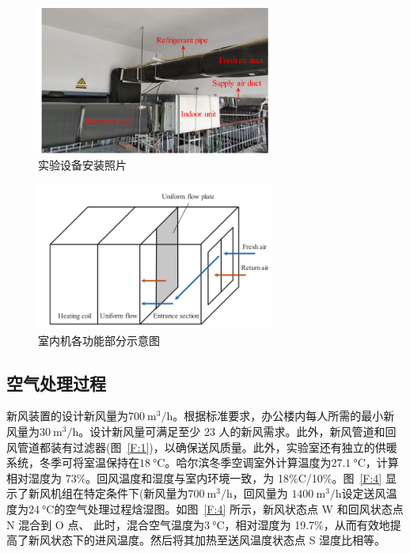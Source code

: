 \begin{figure}[htbp]
	\centering
	\includegraphics[width=0.7\textwidth]{figure/figure_2}
	\caption{实验设备安装照片}
	\label{F:2}
\end{figure}

\begin{figure}[htbp]
	\centering
	\includegraphics[width=0.7\textwidth]{figure/figure_3}
	\caption{室内机各功能部分示意图}
	\label{F:3}
\end{figure}

\subsection{空气处理过程}
新风装置的设计新风量为$\qty{700}{\m^3/\hour}$。根据标准要求，办公楼内每人所需的最小新风量为$\qty{30}{\m^3/\hour} $。设计新风量可满足至少 23 人的新风需求。此外，新风管道和回风管道都装有过滤器(图~\ref{F:1})，以确保送风质量。此外，实验室还有独立的供暖系统，冬季可将室温保持在$\qty{18}{\degreeCelsius} $。哈尔滨冬季空调室外计算温度为$\qty{27.1}{\degreeCelsius} $，计算相对湿度为 73\%。回风温度和湿度与室内环境一致，为 18\%C/10\%。图~\ref{F:4} 显示了新风机组在特定条件下(新风量为$\qty{700}{\m^3/\hour}$，回风量为 $\qty{1400}{\m^3/\hour} $设定送风温度为$\qty{24}{\degreeCelsius} $的空气处理过程焓湿图。如图~\ref{F:4} 所示，新风状态点 W 和回风状态点 N 混合到 O 点、 此时，混合空气温度为$\qty{3}{\degreeCelsius} $，相对湿度为 19.7\%，从而有效地提高了新风状态下的进风温度。然后将其加热至送风温度状态点 S 湿度比相等。

